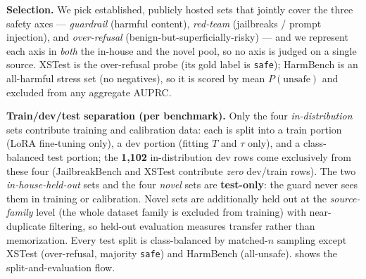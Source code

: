 \documentclass[sigconf,nonacm]{acmart}
\begin{document}
\textbf{Selection.} We pick established, publicly hosted sets that jointly cover the three safety axes --- \emph{guardrail} (harmful content), \emph{red-team} (jailbreaks / prompt injection), and \emph{over-refusal} (benign-but-superficially-risky) --- and we represent each axis in \emph{both} the in-house and the novel pool, so no axis is judged on a single source. XSTest is the over-refusal probe (its gold label is \texttt{safe}); HarmBench is an all-harmful stress set (no negatives), so it is scored by mean $P(\text{unsafe})$ and excluded from any aggregate AUPRC.

\textbf{Train/dev/test separation (per benchmark).} Only the four \emph{in-distribution} sets contribute training and calibration data: each is split into a train portion (LoRA fine-tuning only), a dev portion (fitting $T$ and $\tau$ only), and a class-balanced test portion; the \textbf{1{,}102} in-distribution dev rows come exclusively from these four (JailbreakBench and XSTest contribute \emph{zero} dev/train rows). The two \emph{in-house-held-out} sets and the four \emph{novel} sets are \textbf{test-only}: the guard never sees them in training or calibration. Novel sets are additionally held out at the \emph{source-family} level (the whole dataset family is excluded from training) with near-duplicate filtering, so held-out evaluation measures transfer rather than memorization. Every test split is class-balanced by matched-$n$ sampling except XSTest (over-refusal, majority \texttt{safe}) and HarmBench (all-unsafe).  shows the split-and-evaluation flow.
\end{document}
